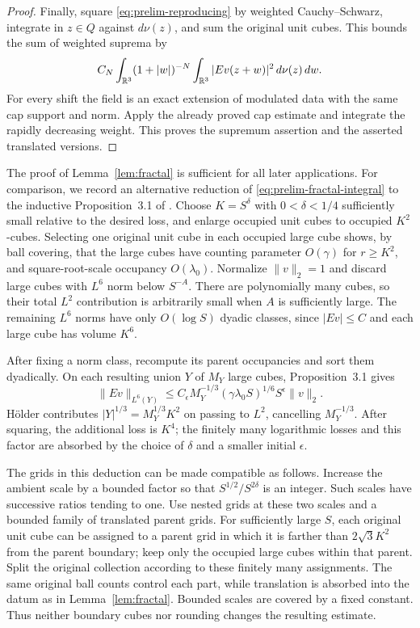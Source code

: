 \begin{proof}
Finally, square \eqref{eq:prelim-reproducing} by weighted
Cauchy--Schwarz, integrate in $z\in Q$ against $d\nu(z)$, and sum the
original unit cubes.  This bounds the sum of weighted suprema by
\[
 C_N\int_{\mathbb R^3}(1+|w|)^{-N}
           \int_{\mathbb R^3}|Ev(z+w)|^2\,d\nu(z)\,dw.
\]
For every shift the field is an exact extension of modulated data with the
same cap support and norm.  Apply the already proved cap estimate and
integrate the rapidly decreasing weight.  This proves the supremum
assertion and the asserted translated versions.
\end{proof}

\begin{remark}
\label{rem:prelim-enlarged-cubes}
The proof of Lemma~\ref{lem:fractal} is sufficient for all later applications.  For comparison,
we record an alternative reduction of \eqref{eq:prelim-fractal-integral} to
the inductive Proposition~3.1 of \cite{DZ19}.  Choose $K=S^\delta$ with $0<\delta<1/4$ sufficiently small
relative to the desired loss, and enlarge occupied unit cubes to occupied
$K^2$-cubes.  Selecting one original unit cube in each occupied large cube
shows, by ball covering, that the large cubes have counting parameter
$O(\gamma)$ for $r\geq K^2$, and square-root-scale occupancy
$O(\lambda_0)$.  Normalize $\|v\|_2=1$ and discard large cubes with
$L^6$ norm below $S^{-A}$.  There are polynomially many cubes, so their
total $L^2$ contribution is arbitrarily small when $A$ is sufficiently
large.  The remaining $L^6$ norms have only $O(\log S)$ dyadic classes,
since $|Ev|\leq C$ and each large cube has volume $K^6$.

After fixing a norm class, recompute its parent occupancies and sort them
dyadically.  On each resulting union $Y$ of $M_Y$ large cubes,
Proposition~3.1 gives
\[
 \|Ev\|_{L^6(Y)}
 \leq C_\epsilon M_Y^{-1/3}
       (\gamma\lambda_0S)^{1/6}S^\epsilon\|v\|_2.
\]
H\"older contributes
$|Y|^{1/3}=M_Y^{1/3}K^2$ on passing to $L^2$, cancelling $M_Y^{-1/3}$.
After squaring, the additional loss is $K^4$; the finitely many logarithmic
losses and this factor are absorbed by the choice of $\delta$ and a smaller
initial $\epsilon$.

The grids in this deduction can be made compatible as follows.  Increase
the ambient scale by a bounded factor so that
$S^{1/2}/S^{2\delta}$ is an integer.  Such scales have successive ratios
tending to one.  Use nested grids at these two scales and a bounded family
of translated parent grids.  For sufficiently large $S$, each original
unit cube can be assigned to a parent grid in which it is farther than
$2\sqrt3 K^2$ from the parent boundary; keep only the occupied large cubes
within that parent.  Split the original collection according to these
finitely many assignments.  The same original ball counts control each
part, while translation is absorbed into the datum as in
Lemma~\ref{lem:fractal}.  Bounded scales are covered by a fixed constant.
Thus neither boundary cubes nor rounding changes the resulting estimate.
\end{remark}
